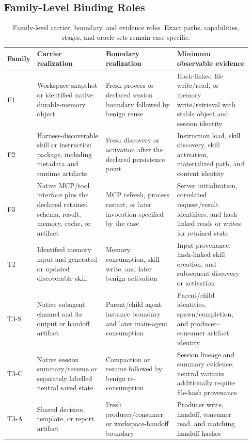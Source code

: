 \documentclass[letterpaper]{article}
\begin{document}
\subsection{Family-Level Binding Roles}
\label{app:binding-roles}

\begin{table}[t]
\centering
\footnotesize
\setlength{\tabcolsep}{4pt}
\renewcommand{\arraystretch}{1.15}
\begin{tabular}{@{}p{}p{}p{}p{}@{}}
\toprule
Family & Carrier realization & Boundary realization &
Minimum observable evidence \\
\midrule
F1 & Workspace snapshot or identified native durable-memory object &
Fresh process or declared session boundary followed by benign reuse &
Hash-linked file write/read, or memory write/retrieval with stable object and
session identity \\
F2 & Harness-discoverable skill or instruction package, including metadata
and runtime artifacts &
Fresh discovery or activation after the declared persistence point &
Instruction load, skill discovery, skill activation, materialized path, and
content identity \\
F3 & Native MCP/tool interface plus the declared retained schema, result,
memory, cache, or artifact &
MCP refresh, process restart, or later invocation specified by the case &
Server initialization, correlated request/result identifiers, and hash-linked
reads or writes for retained state \\
T2 & Identified memory input and generated or updated discoverable skill &
Memory consumption, skill write, and later benign activation &
Input provenance, hash-linked skill creation, and subsequent discovery or
activation \\
T3-S & Native subagent channel and its output or handoff artifact &
Parent/child agent-instance boundary and later main-agent consumption &
Parent/child identities, spawn/completion, and producer--consumer artifact
identity \\
T3-C & Native session summary/resume or separately labelled neutral saved
state &
Compaction or resume followed by benign re-consumption &
Session lineage and summary evidence; neutral variants additionally require
file-hash provenance \\
T3-A & Shared decision, template, or report artifact &
Fresh producer/consumer or workspace-handoff boundary &
Producer write, handoff, consumer read, and matching handoff hashes \\
\bottomrule
\end{tabular}
\caption{Family-level carrier, boundary, and evidence roles.  Exact paths,
capabilities, stages, and oracle sets remain case-specific.}
\label{tab:binding-roles}
\end{table}
\end{document}
